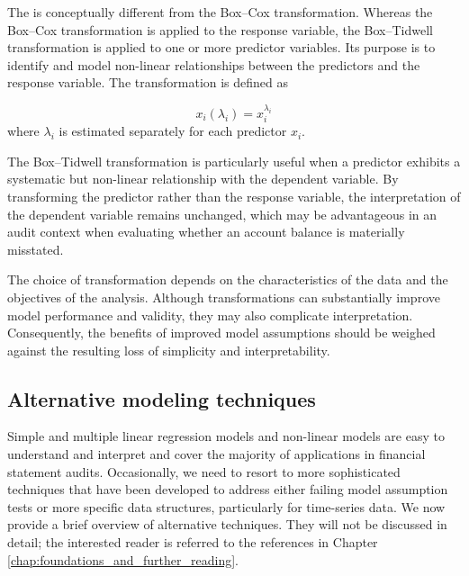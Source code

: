 \bigskip

The  is conceptually different from the Box--Cox transformation. Whereas the Box--Cox transformation is applied to the response variable, the Box--Tidwell transformation is applied to one or more predictor variables. Its purpose is to identify and model non-linear relationships between the predictors and the response variable. The transformation is defined as

\begin{equation}
x_i(\lambda_i)=x_i^{\lambda_i}
\end{equation}
where \(\lambda_i\) is estimated separately for each predictor \(x_i\).

The Box--Tidwell transformation is particularly useful when a predictor exhibits a systematic but non-linear relationship with the dependent variable. By transforming the predictor rather than the response variable, the interpretation of the dependent variable remains unchanged, which may be advantageous in an audit context when evaluating whether an account balance is materially misstated.

\bigskip

The choice of transformation depends on the characteristics of the data and the objectives of the analysis. Although transformations can substantially improve model performance and validity, they may also complicate interpretation. Consequently, the benefits of improved model assumptions should be weighed against the resulting loss of simplicity and interpretability.

\subsection{Alternative modeling techniques} %
\label{sub:alternative_modeling_techniques}

Simple and multiple linear regression models and non-linear models are easy to understand and interpret and cover the majority of applications in financial statement audits. Occasionally, we need to resort to more sophisticated techniques that have been developed to address either failing model assumption tests or more specific data structures, particularly for time-series data. We now provide a brief overview of alternative techniques. They will not be discussed in detail; the interested reader is referred to the references in Chapter \ref{chap:foundations_and_further_reading}.

